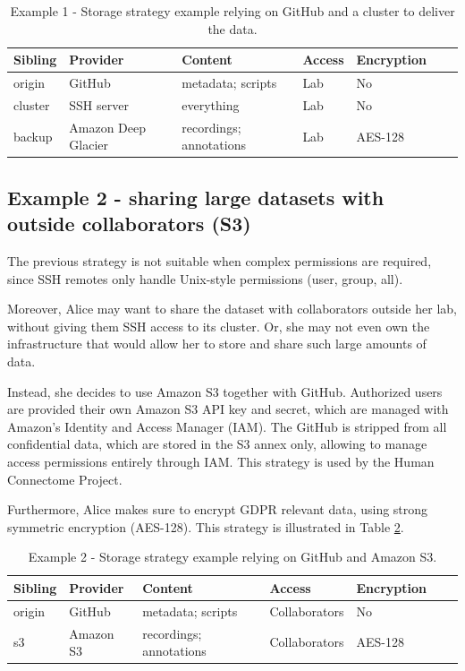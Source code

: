 \documentclass[smallextended]{svjour3}       %
\makeatletter
\newcommand\footnoteref[1]{\protected@xdef\@thefnmark{\ref{#1}}\@footnotemark}
\makeatother
\begin{document}
\begin{table}[!htbp]
\centering
\begin{tabular}{@{}lllllll@{}}
\toprule
\textbf{Sibling} & \textbf{Provider} & \textbf{Content} & \textbf{Access} & \textbf{Encryption} \\ \midrule
origin   & GitHub     & metadata; scripts & Lab & No  \\
cluster  & SSH server & everything & Lab & No  \\
backup & Amazon Deep Glacier  &  recordings; annotations  & Lab            & AES-128 \\ \bottomrule
\end{tabular}
\caption{\label{table:storage1}Example 1 - Storage strategy example relying on GitHub and a cluster to deliver the data.}
\end{table}

\subsection{Example 2 - sharing large datasets with outside collaborators (S3)}

The previous strategy is not suitable when complex permissions are required, since SSH remotes only handle Unix-style permissions (user, group, all).

Moreover, Alice may want to share the dataset with collaborators outside her lab, without giving them SSH access to its cluster. Or, she may not even own the infrastructure that would allow her to store and share such large amounts of data. 

Instead, she decides to use Amazon S3 together with GitHub. Authorized users are provided their own Amazon S3 API key and secret, which are managed with Amazon's Identity and Access Manager (IAM). The GitHub is stripped from all confidential data, which are stored in the S3 annex only, allowing to manage access permissions entirely through IAM. This strategy is used by the Human Connectome Project\footnoteref{note:hcp}.

Furthermore, Alice makes sure to encrypt GDPR relevant data, using strong symmetric encryption (AES-128). This strategy is illustrated in Table \ref{table:storage2}.

\begin{table}[!htbp]
\centering
\begin{tabular}{@{}lllllll@{}}
\toprule
\textbf{Sibling} & \textbf{Provider} & \textbf{Content} & \textbf{Access} & \textbf{Encryption} \\ \midrule
origin   & GitHub     & metadata; scripts & Collaborators & No  \\
s3 & Amazon S3  &  recordings; annotations  & Collaborators  & AES-128 \\ \bottomrule
\end{tabular}
\caption{\label{table:storage2}Example 2 - Storage strategy example relying on GitHub and Amazon S3.}
\end{table}
\end{document}
